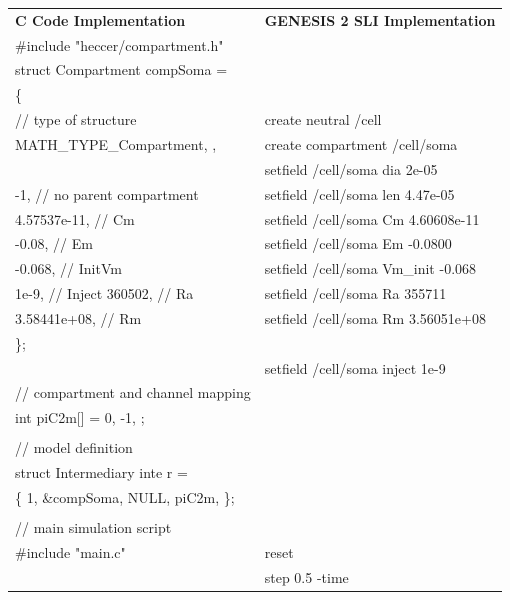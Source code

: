\documentclass[12pt]{article}
\begin{document}
\begin{tabular}{ l l }
    {\bf C Code Implementation} & {\bf GENESIS 2 SLI Implementation} \\
\#include "heccer/compartment.h" & \\
struct Compartment compSoma = & \\
\{ & \\
 // type of structure & create neutral /cell \\
 { MATH\_TYPE\_Compartment, }, & create compartment /cell/soma \\
 & setfield /cell/soma dia 2e-05 \\
 -1,  // no parent compartment & setfield /cell/soma len 4.47e-05 \\
 4.57537e-11, // Cm & setfield /cell/soma Cm 4.60608e-11 \\
 -0.08,       // Em & setfield /cell/soma Em -0.0800 \\
 -0.068,      // InitVm & setfield /cell/soma Vm\_init -0.068 \\
 1e-9,        // Inject
 360502,      // Ra & setfield /cell/soma Ra 355711 \\
 3.58441e+08, // Rm & setfield /cell/soma Rm 3.56051e+08 \\
\}; & \\
 & setfield /cell/soma inject 1e-9 \\
//  compartment and channel mapping & \\
int piC2m[] = { 0, -1, }; & \\
 & \\
// model definition & \\
struct Intermediary inte r = & \\
\{ 1, \&compSoma, NULL, piC2m, \}; & \\
 & \\
// main simulation script & \\
\#include "main.c" & reset \\
 & step 0.5 -time \\
\end{tabular}
\end{document}
